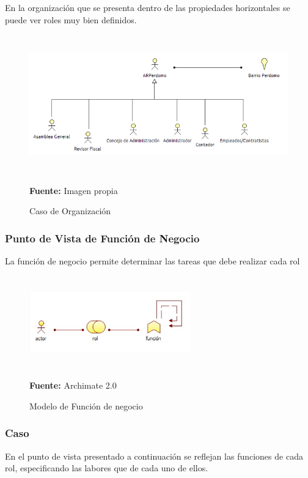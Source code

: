 En la organización que se presenta dentro de las propiedades horizontales se puede ver roles muy bien definidos.

\begin{figure}[th!]
	\centering
	\includegraphics[width=12cm,height=6cm]{arquitectura/negocio/imgs/organizacion}
	\caption{Caso de Organización}{\scriptsize \textbf{Fuente:} Imagen propia}
\end{figure}


\subsubsection{Punto de Vista de Función de Negocio}

La función de negocio permite determinar las tareas que debe realizar cada rol


\begin{figure}[th!]
	\centering
	\includegraphics[width=7cm,height=4cm]{arquitectura/negocio/imgs/funcion-negocio}
	\caption{Modelo de Función de negocio}{\scriptsize \textbf{Fuente:} Archimate 2.0 \cite{WEB7}}
\end{figure}

\subsubsection{Caso}

En el punto de vista presentado a continuación se reflejan las funciones de cada rol, especificando las labores que de cada uno de ellos.

